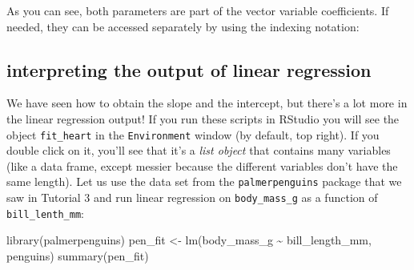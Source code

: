 \documentclass[
  letterpaper,
  DIV=11,
  numbers=noendperiod]{scrreprt}
\newenvironment{Shaded}{\begin{snugshade}}{\end{snugshade}}
\newcommand{\NormalTok}[1]{\textcolor[rgb]{0.00,0.23,0.31}{#1}}
\begin{document}
\begin{Shaded}
\end{Shaded}

As you can see, both parameters are part of the vector variable
coefficients. If needed, they can be accessed separately by using the
indexing notation:

\begin{Shaded}
\end{Shaded}

\hypertarget{interpreting-the-output-of-linear-regression}{%
\subsection*{interpreting the output of linear
regression}\label{interpreting-the-output-of-linear-regression}}

We have seen how to obtain the slope and the intercept, but there's a
lot more in the linear regression output! If you run these scripts in
RStudio you will see the object \texttt{fit\_heart} in the
\texttt{Environment} window (by default, top right). If you double click
on it, you'll see that it's a \emph{list object} that contains many
variables (like a data frame, except messier because the different
variables don't have the same length). Let us use the data set from the
\texttt{palmerpenguins} package that we saw in Tutorial 3 and run linear
regression on \texttt{body\_mass\_g} as a function of
\texttt{bill\_lenth\_mm}:

\begin{Shaded}
\begin{Highlighting}[]
\NormalTok{library(palmerpenguins)}
\NormalTok{pen\_fit \textless{}{-} lm(body\_mass\_g \textasciitilde{} bill\_length\_mm, penguins)}
\NormalTok{summary(pen\_fit)}
\end{Highlighting}
\end{Shaded}
\end{document}
